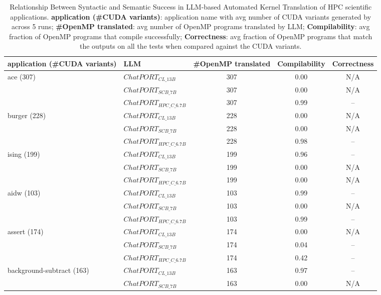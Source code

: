 \begin{table}[t]
\centering
\caption{Relationship Between Syntactic and Semantic Success in LLM-based Automated Kernel Translation of HPC scientific applications. \textbf{application (\#CUDA variants)}: application name with avg number of CUDA variants generated by \toolname across 5 runs; \textbf{\#OpenMP translated}: avg number of OpenMP programs translated by LLM; \textbf{Compilability}: avg fraction of OpenMP programs that compile successfully; \textbf{Correctness}: avg fraction of OpenMP programs that match the outputs on all the tests when compared against the CUDA variants.}
\label{tab:rq1_syntactic_semantic}
\begin{tabular}{llccc}
\toprule
\textbf{application (\#CUDA variants)} & \textbf{LLM} & \textbf{\#OpenMP translated} & \textbf{Compilability} & \textbf{Correctness} \\
\toprule
\multirow{3}{*}{ace (307)} &  $ChatPORT_{CL\_13B}$ & 307 & 0.00 & N/A  \\
&  $ChatPORT_{SCB\_7B}$ & 307 & 0.00 & N/A \\
&  $ChatPORT_{HPC\_C\_6.7B}$ & 307 & 0.99 & -- \\
\hline 
\multirow{3}{*}{burger (228)} &  $ChatPORT_{CL\_13B}$ & 228 & 0.00 & N/A  \\
&  $ChatPORT_{SCB\_7B}$ & 228 & 0.00 & N/A \\
&  $ChatPORT_{HPC\_C\_6.7B}$ & 228 & 0.98 & -- \\
\hline 
\multirow{3}{*}{ising (199)} &  $ChatPORT_{CL\_13B}$ & 199 & 0.96 & --  \\
&  $ChatPORT_{SCB\_7B}$ & 199 & 0.00 & N/A \\
&  $ChatPORT_{HPC\_C\_6.7B}$ & 199 & 0.00 & N/A \\
\hline 
\multirow{3}{*}{aidw (103)} &  $ChatPORT_{CL\_13B}$ & 103 & 0.99 & --  \\
&  $ChatPORT_{SCB\_7B}$ & 103 & 0.00 & N/A \\
&  $ChatPORT_{HPC\_C\_6.7B}$ & 103 & 0.99 & -- \\
\hline 
\multirow{3}{*}{assert (174)} &  $ChatPORT_{CL\_13B}$ & 174 & 0.00 & N/A  \\
&  $ChatPORT_{SCB\_7B}$ & 174 & 0.04 & -- \\
&  $ChatPORT_{HPC\_C\_6.7B}$ & 174 & 0.42 & -- \\
\hline 
\multirow{3}{*}{background-subtract (163)} &  $ChatPORT_{CL\_13B}$ & 163 & 0.97 & --  \\
&  $ChatPORT_{SCB\_7B}$ & 163 & 0.00 & N/A \\

\end{tabular}
\end{table}
